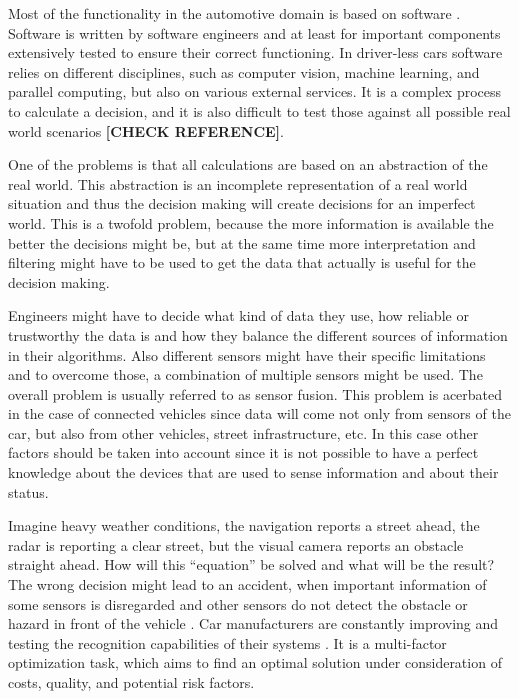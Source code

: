 Most of the functionality in the automotive domain is based on software \cite{Broy2007}. Software is written by software engineers and at least for important components extensively tested to ensure their correct functioning. In driver-less cars software relies on different disciplines, such as computer vision, machine learning, and parallel computing, but also on various external services. It is a complex process to calculate a decision, and it is also difficult to test those against all possible real world scenarios \cite{Waldrop2015} \textbf{[CHECK REFERENCE]}. %

One of the problems is that all calculations are based on an abstraction of the real world. This abstraction is an incomplete representation of a real world situation and thus the decision making will create decisions for an imperfect world. This is a twofold problem, because the more information is available the better the decisions might be, but at the same time more interpretation and filtering might have to be used to get the data that actually is useful for the decision making. 

Engineers might have to decide what kind of data they use, how reliable or trustworthy the data is and how they balance the different sources of information in their algorithms. Also different sensors might have their specific limitations and to overcome those, a combination of multiple sensors might be used. The overall problem is usually referred to as sensor fusion. This problem is acerbated in the case of connected vehicles since data will come not only from sensors of the car, but also from other vehicles, street infrastructure, etc. In this case other factors should be taken into account since it is not possible to have a perfect knowledge about the devices that are used to sense information and about their status.

Imagine heavy weather conditions, the navigation reports a street ahead, the radar is reporting a clear street, but the visual camera reports an obstacle straight ahead. How will this “equation” be solved and what will be the result? The wrong decision might lead to an accident, when important information of some sensors is disregarded and other sensors do not detect the obstacle or hazard in front of the vehicle \cite{Tesla2016_tragicloss}. Car manufacturers are constantly improving and testing the recognition capabilities of their systems \cite{Tesla2016_upgrade}. It is a multi-factor optimization task, which aims to find an optimal solution under consideration of costs, quality, and potential risk factors.


